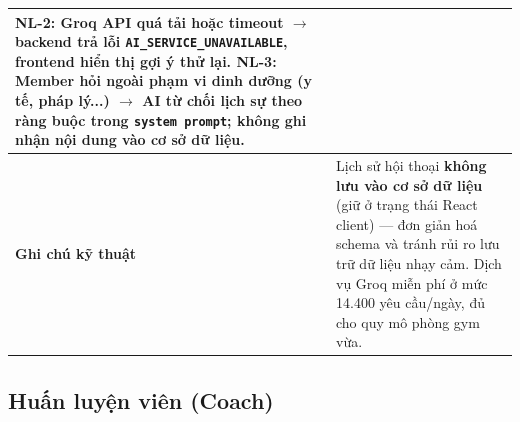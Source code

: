 \begin{longtable}{|>{\centering\arraybackslash}m{3cm}|>{\raggedright\arraybackslash}m{12cm}|}
\textbf{NL-2:} Groq API quá tải hoặc timeout $\rightarrow$ backend trả lỗi \texttt{AI\_SERVICE\_UNAVAILABLE}, frontend hiển thị gợi ý thử lại. \newline
\textbf{NL-3:} Member hỏi ngoài phạm vi dinh dưỡng (y tế, pháp lý...) $\rightarrow$ AI từ chối lịch sự theo ràng buộc trong \texttt{system prompt}; không ghi nhận nội dung vào cơ sở dữ liệu. \\
\hline
\textbf{Ghi chú kỹ thuật} &
Lịch sử hội thoại \textbf{không lưu vào cơ sở dữ liệu} (giữ ở trạng thái React client) — đơn giản hoá schema và tránh rủi ro lưu trữ dữ liệu nhạy cảm. Dịch vụ Groq miễn phí ở mức 14.400 yêu cầu/ngày, đủ cho quy mô phòng gym vừa. \\
\hline
\end{longtable}
\endgroup

\subsection{Huấn luyện viên (Coach)}

